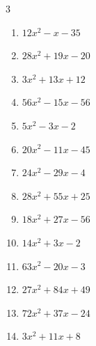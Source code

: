 \begin{multicols}{3}
\begin{enumerate}
  \item $12x^{2}-x-35$

        \phantom{$=(4x-7)(3x+5)$}

\columnbreak %

  \item $28x^{2}+19x-20$

        \phantom{$=(7x-4)(4x+5)$}

  \item $3x^{2}+13x+12$

        \phantom{$=(3x+4)(x+3)$}

  \item $56x^{2}-15x-56$

        \phantom{$=(8x+7)(7x-8)$}

  \item $5x^{2}-3x-2$

        \phantom{$=(5x+2)(x-1)$}

  \item $20x^{2}-11x-45$

        \phantom{$=(4x+5)(5x-9)$}

  \item $24x^{2}-29x-4$

        \phantom{$=(8x+1)(3x-4)$}

  \item $28x^{2}+55x+25$

        \phantom{$=(4x+5)(7x+5)$}

  \item $18x^{2}+27x-56$

        \phantom{$=(6x-7)(3x+8)$}

  \item $14x^{2}+3x-2$

        \phantom{$=(2x+1)(7x-2)$}

  \item $63x^{2}-20x-3$

        \phantom{$=(9x+1)(7x-3)$}

\columnbreak %

  \item $27x^{2}+84x+49$

        \phantom{$=(9x+7)(3x+7)$}

  \item $72x^{2}+37x-24$

        \phantom{$=(8x-3)(9x+8)$}

  \item $3x^{2}+11x+8$

        \phantom{$=(x+1)(3x+8)$}


\end{enumerate}
\end{multicols}
